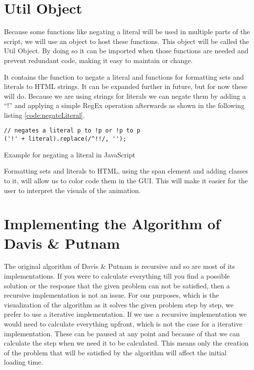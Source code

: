 \section{Util Object}
\label{sec:impUtil}
Because some functions like negating a literal will be used in multiple parts of the script, we will use an object to host these functions. This object will be called the Util Object. By doing so it can be imported when those functions are needed and prevent redundant code, making it easy to maintain or change.

It contains the function to negate a literal and functions for formatting sets and literals to HTML strings. It can be expanded further in future, but for now these will do.
Because we are using strings for literals we can negate them by adding a ``!'' and applying a simple RegEx operation afterwards as shown in the following listing \ref{code:negateLiteral}.

\begin{listing}[h!]
\begin{verbatim}
// negates a literal p to !p or !p to p
('!' + literal).replace(/^!!/, '');
\end{verbatim}
    \caption{Example for negating a literal in JavaScript}
    \label{code:negateLiteral}
\end{listing}

Formatting sets and literals to HTML, using the span element and adding classes to it, will allow us to color code them in the GUI. This will make it easier for the user to interpret the visuals of the animation.

\section{Implementing the Algorithm of Davis \& Putnam}
\label{sec:impDavisPutnam}
The original algorithm of Davis \& Putnam is recursive and so are most of its implementations. If you were to calculate everything till you find a possible solution or the response that the given problem can not be satisfied, then a recursive implementation is not an issue. For our purposes, which is the visualization of the algorithm as it solves the given problem step by step, we prefer to use a iterative implementation. If we use a recursive implementation we would need to calculate everything upfront, which is not the case for a iterative implementation. These can be paused at any point and because of that we can calculate the step when we need it to be calculated. This means only the creation of the problem that will be satisfied by the algorithm will affect the initial loading time.

